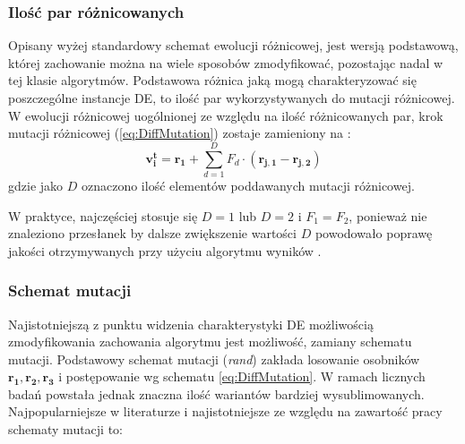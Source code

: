 \documentclass[12pt,a4paper]{report}
\begin{document}
{{\subsubsection{Ilość par różnicowanych}
\par{
Opisany wyżej standardowy schemat ewolucji różnicowej, jest wersją podstawową, której zachowanie można na wiele sposobów zmodyfikować, pozostając nadal w tej klasie algorytmów. Podstawowa różnica jaką mogą charakteryzować się poszczególne instancje DE, to ilość par wykorzystywanych do mutacji różnicowej. W ewolucji różnicowej uogólnionej ze względu na ilość różnicowanych par, krok mutacji różnicowej (\ref{eq:DiffMutation}) zostaje zamieniony na \cite{PracticalInsights}:
\begin{equation}
\mathbf{v_i^{t}} = \mathbf{r_1} + \sum_{d = 1}^D F_d \cdot (\mathbf{r_{j,1}} - \mathbf{r_{j,2}})
\end{equation}
gdzie jako $D$ oznaczono ilość elementów poddawanych mutacji różnicowej.
}
\par{
W praktyce, najczęściej stosuje się $D = 1$ lub $D = 2$ i $F_1 = F_2$, ponieważ nie znaleziono przesłanek by dalsze zwiększenie wartości $D$ powodowało poprawę jakości otrzymywanych przy użyciu algorytmu wyników \cite{PracticalInsights}.
\subsubsection{Schemat mutacji}
\par{
Najistotniejszą z punktu widzenia charakterystyki DE możliwością zmodyfikowania zachowania algorytmu jest możliwość, zamiany schematu mutacji. Podstawowy schemat mutacji (\emph{rand}) zakłada losowanie osobników $\mathbf{r_1}, \mathbf{r_2}, \mathbf{r_3}$ i postępowanie wg schematu \ref{eq:DiffMutation}. W ramach licznych badań powstała jednak znaczna ilość wariantów bardziej wysublimowanych. Najpopularniejsze w literaturze i najistotniejsze ze względu na zawartość pracy schematy mutacji to:
\begin{description}


\end{description}}}}}
\end{document}
